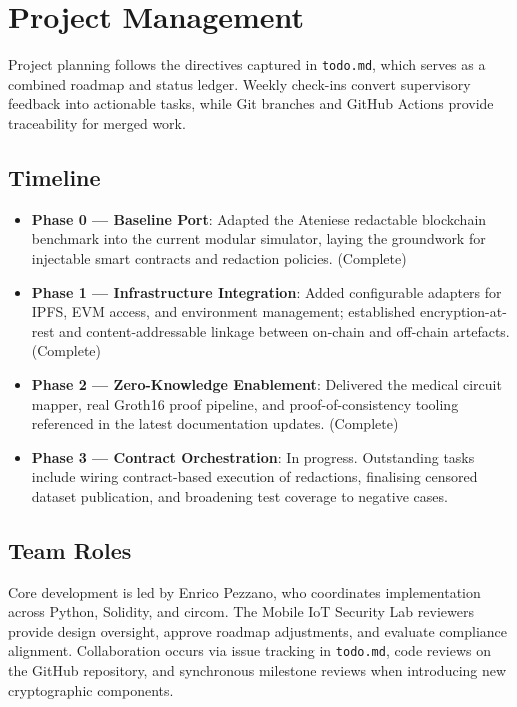 \section{Project Management}

Project planning follows the directives captured in \texttt{todo.md}, which serves as a combined roadmap and status ledger. Weekly check-ins convert supervisory feedback into actionable tasks, while Git branches and GitHub Actions provide traceability for merged work.

\subsection{Timeline}
\begin{itemize}
    \item \textbf{Phase 0 --- Baseline Port}: Adapted the Ateniese redactable blockchain benchmark into the current modular simulator, laying the groundwork for injectable smart contracts and redaction policies. (Complete)
    \item \textbf{Phase 1 --- Infrastructure Integration}: Added configurable adapters for IPFS, EVM access, and environment management; established encryption-at-rest and content-addressable linkage between on-chain and off-chain artefacts. (Complete)
    \item \textbf{Phase 2 --- Zero-Knowledge Enablement}: Delivered the medical circuit mapper, real Groth16 proof pipeline, and proof-of-consistency tooling referenced in the latest documentation updates. (Complete)
    \item \textbf{Phase 3 --- Contract Orchestration}: In progress. Outstanding tasks include wiring contract-based execution of redactions, finalising censored dataset publication, and broadening test coverage to negative cases.
\end{itemize}

\subsection{Team Roles}
Core development is led by Enrico Pezzano, who coordinates implementation across Python, Solidity, and circom. The Mobile IoT Security Lab reviewers provide design oversight, approve roadmap adjustments, and evaluate compliance alignment. Collaboration occurs via issue tracking in \texttt{todo.md}, code reviews on the GitHub repository, and synchronous milestone reviews when introducing new cryptographic components.

